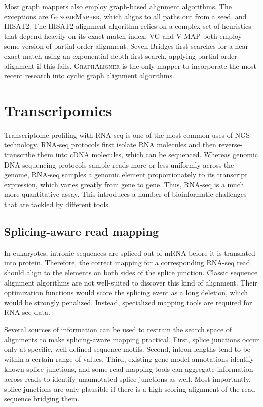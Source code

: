 \documentclass[11pt]{ucthesis}
\begin{document}
Most graph mappers also employ graph-based alignment algorithms. 
The exceptions are \textsc{GenomeMapper}, which aligns to all paths out from a seed, and \textsc{HISAT2}.
The \textsc{HISAT2} alignment algorithm relies on a complex set of heuristics that depend heavily on its exact match index.
\textsc{VG} and \textsc{V-MAP} both employ some version of partial order alignment.
Seven Bridges first searches for a near-exact match using an exponential depth-first search, applying partial order alignment if this fails.
\textsc{GraphAligner} is the only mapper to incorporate the most recent research into cyclic graph alignment algorithms.

\section{Transcripomics}

Transcriptome profiling with RNA-seq is one of the most common uses of NGS technology\cite{mortazavi2008mapping}. RNA-seq protocols first isolate RNA molecules and then reverse-transcribe them into cDNA molecules, which can be sequenced. Whereas genomic DNA sequencing protocols sample reads more-or-less uniformly across the genome, RNA-seq samples a genomic element proportionately to its transcript expression, which varies greatly from gene to gene. Thus, RNA-seq is a much more quantitative assay. This introduces a number of bioinformatic challenges that are tackled by different tools.

\subsection{Splicing-aware read mapping} 

In eukaryotes, intronic sequences are spliced out of mRNA before it is translated into protein. Therefore, the correct mapping for a corresponding RNA-seq read should align to the elements on both sides of the splice junction. Classic sequence alignment algorithms are not well-suited to discover this kind of alignment. Their optimization functions would score the splicing event as a long deletion, which would be strongly penalized. Instead, specialized mapping tools are required for RNA-seq data\cite{dobin2013star,kim2013tophat2,kim2015hisat}.

Several sources of information can be used to restrain the search space of alignments to make splicing-aware mapping practical. First, splice junctions occur only at specific, well-defined sequence motifs\cite{burset2000analysis}. Second, intron lengths tend to be within a certain range of values\cite{gotoh2018modeling}. Third, existing gene model annotations identify known splice junctions\cite{dobin2013star}, and some read mapping tools can aggregate information across reads to identify unannotated splice junctions as well\cite{kim2013tophat2}. Most importantly, splice junctions are only plausible if there is a high-scoring alignment of the read sequence bridging them.
\end{document}
